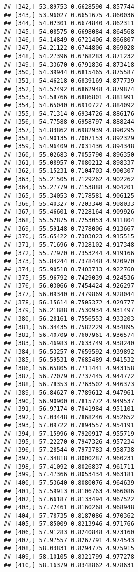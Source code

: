 \documentclass[]{book}
\theoremstyle{definition}
\theoremstyle{definition}
\theoremstyle{definition}
\theoremstyle{remark}
\begin{document}
\begin{verbatim}
## [342,] 53.89753 0.6628590 4.857744
## [343,] 53.96027 0.6651675 4.860036
## [344,] 54.02301 0.6674840 4.862311
## [345,] 54.08575 0.6698084 4.864568
## [346,] 54.14849 0.6721406 4.866807
## [347,] 54.21122 0.6744806 4.869028
## [348,] 54.27396 0.6768283 4.871232
## [349,] 54.33670 0.6791836 4.873418
## [350,] 54.39944 0.6815465 4.875587
## [351,] 54.46218 0.6839169 4.877739
## [352,] 54.52492 0.6862948 4.879874
## [353,] 54.58766 0.6886801 4.881991
## [354,] 54.65040 0.6910727 4.884092
## [355,] 54.71314 0.6934726 4.886176
## [356,] 54.77588 0.6958797 4.888244
## [357,] 54.83862 0.6982939 4.890295
## [358,] 54.90135 0.7007153 4.892329
## [359,] 54.96409 0.7031436 4.894348
## [360,] 55.02683 0.7055790 4.896350
## [361,] 55.08957 0.7080212 4.898337
## [362,] 55.15231 0.7104703 4.900307
## [363,] 55.21505 0.7129262 4.902262
## [364,] 55.27779 0.7153888 4.904201
## [365,] 55.34053 0.7178581 4.906125
## [366,] 55.40327 0.7203340 4.908033
## [367,] 55.46601 0.7228164 4.909926
## [368,] 55.52875 0.7253053 4.911804
## [369,] 55.59148 0.7278006 4.913667
## [370,] 55.65422 0.7303023 4.915515
## [371,] 55.71696 0.7328102 4.917348
## [372,] 55.77970 0.7353244 4.919166
## [373,] 55.84244 0.7378448 4.920970
## [374,] 55.90518 0.7403713 4.922760
## [375,] 55.96792 0.7429039 4.924536
## [376,] 56.03066 0.7454424 4.926297
## [377,] 56.09340 0.7479869 4.928044
## [378,] 56.15614 0.7505372 4.929777
## [379,] 56.21888 0.7530934 4.931497
## [380,] 56.28161 0.7556553 4.933203
## [381,] 56.34435 0.7582229 4.934895
## [382,] 56.40709 0.7607961 4.936574
## [383,] 56.46983 0.7633749 4.938240
## [384,] 56.53257 0.7659592 4.939892
## [385,] 56.59531 0.7685489 4.941532
## [386,] 56.65805 0.7711441 4.943158
## [387,] 56.72079 0.7737445 4.944772
## [388,] 56.78353 0.7763502 4.946373
## [389,] 56.84627 0.7789612 4.947961
## [390,] 56.90900 0.7815772 4.949537
## [391,] 56.97174 0.7841984 4.951101
## [392,] 57.03448 0.7868246 4.952652
## [393,] 57.09722 0.7894557 4.954191
## [394,] 57.15996 0.7920917 4.955719
## [395,] 57.22270 0.7947326 4.957234
## [396,] 57.28544 0.7973783 4.958738
## [397,] 57.34818 0.8000287 4.960231
## [398,] 57.41092 0.8026837 4.961711
## [399,] 57.47366 0.8053434 4.963181
## [400,] 57.53640 0.8080076 4.964639
## [401,] 57.59913 0.8106763 4.966086
## [402,] 57.66187 0.8133494 4.967522
## [403,] 57.72461 0.8160268 4.968948
## [404,] 57.78735 0.8187086 4.970362
## [405,] 57.85009 0.8213946 4.971766
## [406,] 57.91283 0.8240848 4.973160
## [407,] 57.97557 0.8267791 4.974543
## [408,] 58.03831 0.8294775 4.975915
## [409,] 58.10105 0.8321799 4.977278
## [410,] 58.16379 0.8348862 4.978631

\end{verbatim}
\end{document}

